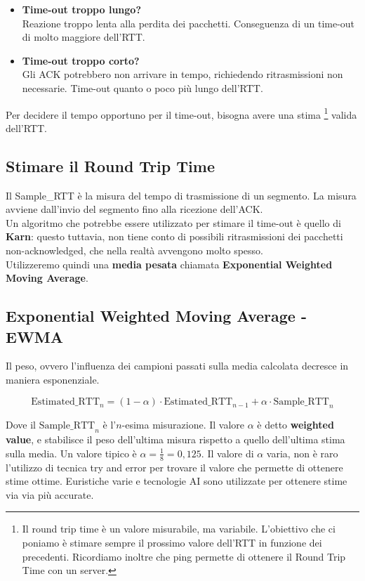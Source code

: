 \begin{itemize}
	\item \textbf{Time-out troppo lungo?}\\
	Reazione troppo lenta alla perdita dei pacchetti. Conseguenza di un time-out di molto maggiore dell'RTT.
	
	\item \textbf{Time-out troppo corto?}\\
	Gli ACK potrebbero non arrivare in tempo, richiedendo ritrasmissioni non necessarie. Time-out quanto o poco più lungo dell'RTT.
\end{itemize}

Per decidere il tempo opportuno per il time-out, bisogna avere una stima \footnote{Il round trip time è un valore misurabile, ma variabile. L'obiettivo che ci poniamo è stimare sempre il prossimo valore dell'RTT in funzione dei precedenti. Ricordiamo inoltre che ping permette di ottenere il Round Trip Time con un server.} valida dell'RTT. 


\subsection{Stimare il Round Trip Time}
Il Sample\_RTT è la misura del tempo di trasmissione di un segmento. La misura avviene dall'invio del segmento fino alla ricezione dell'ACK.\\
Un algoritmo che potrebbe essere utilizzato per stimare il time-out è quello di \textbf{Karn}: questo tuttavia, non tiene conto di possibili ritrasmissioni dei pacchetti non-acknowledged, che nella realtà avvengono molto spesso.\\
Utilizzeremo quindi una \textbf{media pesata} chiamata \textbf{Exponential Weighted Moving Average}.

\newpage

\subsection{Exponential Weighted Moving Average - EWMA}
Il peso, ovvero l'influenza dei campioni passati sulla media calcolata decresce in maniera esponenziale.

$$
\text{Estimated\_RTT}_n = (1-\alpha)\cdot \text{Estimated\_RTT}_{n-1} + \alpha \cdot  \text{Sample\_RTT}_n
$$

Dove il $\text{Sample\_RTT}_n$ è l'$n$-esima misurazione. Il valore $\alpha$ è detto \textbf{weighted value}, e stabilisce il peso dell'ultima misura rispetto a quello dell'ultima stima sulla media. Un valore tipico è $\alpha = \frac{1}{8} = 0,125$. Il valore di $\alpha$ varia, non è raro l'utilizzo di tecnica try and error per trovare il valore che permette di ottenere stime ottime.
Euristiche varie e tecnologie AI sono utilizzate per ottenere stime via via più accurate.

